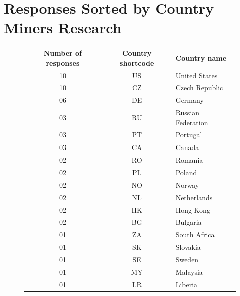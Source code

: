 \documentclass[
  printed, %
  table,   %
  lof,     %
  lot,     %
           oneside, color
]{fithesis3}
\begin{document}
\chapter{Responses Sorted by Country -- Miners Research}
\vspace{-2em}
\begin{figure}[H]
\center
\begin{tabular}{ccl}
\textbf{Number of responses} & \textbf{Country shortcode} & \textbf{Country name} \\
10                           & US                         & United States         \\
10                           & CZ                         & Czech Republic        \\
06                            & DE                         & Germany               \\
03                            & RU                         & Russian Federation    \\
03                            & PT                         & Portugal              \\
03                            & CA                         & Canada                \\
02                            & RO                         & Romania               \\
02                            & PL                         & Poland                \\
02                            & NO                         & Norway                \\
02                            & NL                         & Netherlands           \\
02                            & HK                         & Hong Kong             \\
02                            & BG                         & Bulgaria              \\
01                            & ZA                         & South Africa          \\
01                            & SK                         & Slovakia              \\
01                            & SE                         & Sweden                \\
01                            & MY                         & Malaysia              \\
01                            & LR                         & Liberia               \\

\end{tabular}
\end{figure}
\end{document}

